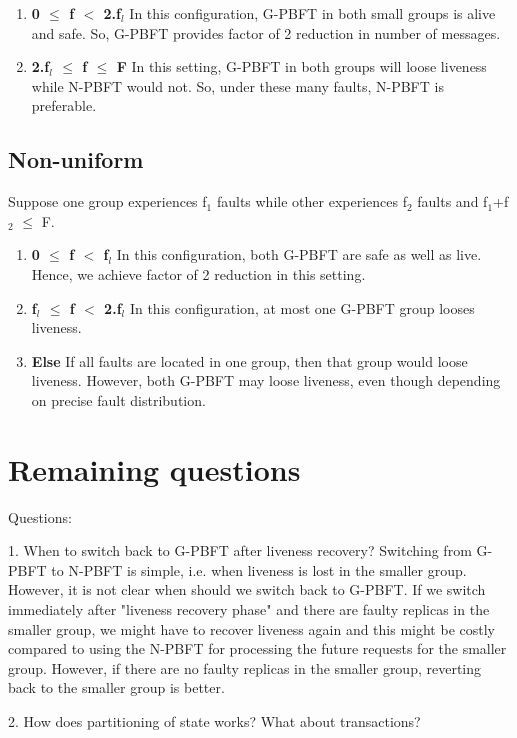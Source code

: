 \documentclass[twocolumn,10pt]{article}
\begin{document}
\begin{enumerate}
\item{\textbf{0 $\le$ f $<$ 2.f$_{l}$}} In this configuration, G-PBFT in both small groups is alive and safe.
So, G-PBFT provides factor of 2 reduction in number of messages.

\item{\textbf{2.f$_{l}$ $\le$ f $\le$ F}} In this setting, G-PBFT in both groups will loose liveness while N-PBFT would not.
So, under these many faults, N-PBFT is preferable.
\end{enumerate}

\subsection{Non-uniform}
Suppose one group experiences f$_{1}$ faults while other experiences f$_{2}$ faults and f$_{1}$+f$_{2}$
$\le$ F. 

\begin{enumerate}

\item{\textbf{0 $\le$ f $<$ f$_{l}$}} In this configuration, both G-PBFT are safe as well as live. Hence, we achieve
factor of 2 reduction in this setting.

\item{\textbf{f$_{l}$ $\le$ f $<$ 2.f$_{l}$}} In this configuration, at most one G-PBFT group looses liveness.

\item{\textbf{Else}} If all faults are located in one group, then that group would loose liveness. However, both G-PBFT may loose liveness, even though depending on precise fault distribution.

\end{enumerate}

\section{Remaining questions}

Questions:

1. When to switch back to G-PBFT after liveness recovery? Switching from G-PBFT to N-PBFT is simple, i.e. when liveness
is lost in the smaller group. However, it is not clear when should we switch back to G-PBFT. If we switch immediately after "liveness recovery phase" and there are faulty replicas in the smaller group, we might have to recover liveness again and this might be costly compared to using the N-PBFT for processing the future requests for the smaller group. However, if there are no faulty replicas in the smaller group, reverting back to the smaller group is better. 


2. How does partitioning of state works? What about transactions?
\end{document}

